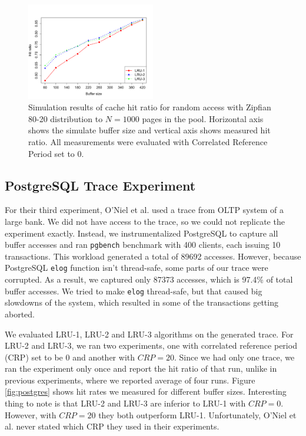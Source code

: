 \begin{figure}[t!]
    \centering
	\includegraphics[width=0.5\textwidth]{./figures/zipfian.pdf}
	\caption{Simulation results of cache hit ratio for random access with Zipfian 80-20 distribution to $N = 1000$ pages in the pool. Horizontal axis shows the simulate buffer size and vertical axis shows measured hit ratio. All measurements were evaluated with Correlated Reference Period set to 0.}
	\label{fig:zipfian}
\end{figure}


\subsection{PostgreSQL Trace Experiment}

For their third experiment, O'Niel et al. \cite{lruk} used a trace from OLTP system of a large bank. We did not have access to the trace, so we could not replicate the experiment exactly. Instead, we instrumentalized PostgreSQL to capture all buffer accesses and ran \texttt{pgbench} benchmark with 400 clients, each issuing 10 transactions. This workload generated a total of 89692 accesses. However, because PostgreSQL \texttt{elog} function isn't thread-safe, some parts of our trace were corrupted. As a result, we captured only 87373 accesses, which is 97.4\% of total buffer accesses. We tried to make \texttt{elog} thread-safe, but that caused big slowdowns of the system, which resulted in some of the transactions getting aborted.

We evaluated LRU-1, LRU-2 and LRU-3 algorithms on the generated trace. For LRU-2 and LRU-3, we ran two experiments, one with correlated reference period (CRP) set to be 0 and another with $CRP = 20$. Since we had only one trace, we ran the experiment only once and report the hit ratio of that run, unlike in previous experiments, where we reported average of four runs. Figure \ref{fig:postgres} shows hit rates we measured for different buffer sizes. Interesting thing to note is that LRU-2 and LRU-3 are inferior to LRU-1 with $CRP = 0$. However, with $CRP = 20$ they both outperform LRU-1. Unfortunately, O'Niel et al. \cite{lruk} never stated which CRP they used in their experiments.

